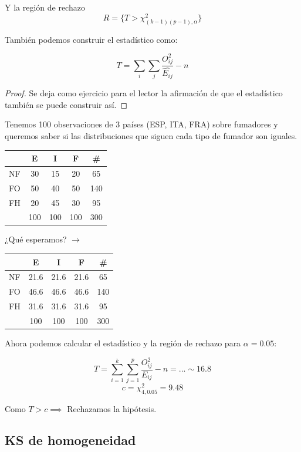 \begin{enumerate}
Y la región de rechazo \[R = \{T>\chi^2_{(k-1)(p-1),α}\}\]

\obs También podemos construir el estadístico como:

\[
T = \sum_{i}\sum_j \frac{O_{ij}^2}{\hat{E_{ij}}} - n
\]

\begin{proof}
Se deja como ejercicio para el lector la afirmación de que el estadístico también se puede construir así.
\end{proof}
\end{enumerate}


\begin{example}

Tenemos 100 observaciones de 3 países (ESP, ITA, FRA) sobre fumadores y queremos saber si las distribuciones que siguen cada tipo de fumador son iguales.

\begin{center}


\begin{tabular}{c|ccc|c}
 & E & I & F & \#\\\hline
NF&30&15&20&65\\
FO&50&40&50&140\\
FH&20&45&30&95\\\hline
&100 & 100 & 100 & 300
\end{tabular}
¿Qué esperamos? $\to$
\begin{tabular}{c|ccc|c}
 & E & I & F & \#\\\hline
NF & 21.6 & 21.6 & 21.6 & 65 \\
FO & 46.6 & 46.6 & 46.6 & 140 \\
FH & 31.6 & 31.6 & 31.6 & 95 \\
\hline
&100 & 100 & 100 & 300
\end{tabular}
\end{center}

Ahora podemos calcular el estadístico y la región de rechazo para $α=0.05$:

\[ T = \sum_{i=1}^k \sum_{j=1}^p \frac{O_{ij}^2}{E_{ij}} -n = ... \sim 16.8\]
\[ c = \chi^2_{4,0.05} = 9.48\]

Como $T > c \implies $ Rechazamos la hipótesis.

\end{example}

\subsection{KS de homogeneidad}

